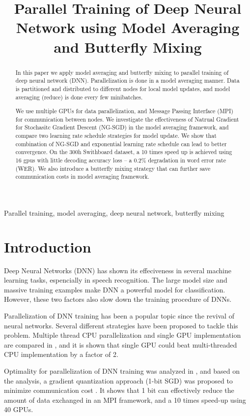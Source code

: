 \documentclass{article}
\title{Parallel Training of Deep Neural Network using Model Averaging and Butterfly Mixing}
\begin{document}
%
\maketitle
%
\begin{abstract}
In this paper we apply model averaging and butterfly mixing to parallel training of deep neural network (DNN). 
Parallelization is done in a model averaging manner. Data is partitioned and distributed to different nodes for 
local model updates, and model averaging (reduce) is done every few minibatches. 

We use multiple GPUs for data parallelization, and Message Passing Interface (MPI) for communication between nodes. 
We investigate the effectiveness of Natrual Gradient for Stochasitc Gradient Descent (NG-SGD) in the model averaging
framework, and compare two learning rate schedule strategies for model update. We show that combination of 
NG-SGD and exponential learning rate schedule can lead to better convergence. On the 300h Swithboard dataset, a 10 
times speed up is achieved using 16 gpus with little decoding accuracy loss -- a 0.2\% degradation in word error rate 
(WER). We also introduce a butterfly mixing strategy that can further save communication costs in model averaging framework.
\end{abstract}
%
\begin{keywords}
Parallel training, model averaging, deep neural network, butterfly mixing
\end{keywords}
%
\section{Introduction}
\label{sec:intro}
Deep Neural Networks (DNN) has shown its effeciveness in several machine learning tasks, espencially in speech
recognition. The large model size and massive training examples make DNN a powerful model for classification. However,
these two factors also slow down the training procedure of DNNs.

Parallelization of DNN training has been a popular topic since the revival of neural networks. Several different strategies
have been proposed to tackle this problem. Multiple thread CPU parallelization and single GPU implementation are compared
in \cite{scanzio2010parallel,vesely2010parallel}, and it is shown that single GPU could beat multi-threaded CPU implementation
by a factor of 2.

Optimality for parallelization of DNN training was analyzed in \cite{seide2014parallelizability}, and based on the analysis, 
a gradient quantization approach (1-bit SGD) was proposed to minimize communication cost \cite{seide20141}. It shows that 1 bit
can effectively reduce the amount of data exchanged in an MPI framework, and a 10 times speed-up using 40 GPUs.
\end{document}

